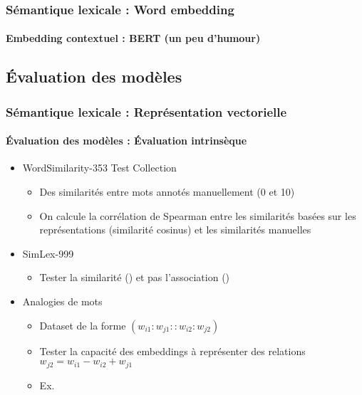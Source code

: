 \documentclass[xcolor=table]{beamer}
\begin{document}
\begin{frame}
\frametitle{Sémantique lexicale : Word embedding}
\framesubtitle{Embedding contextuel : BERT (un peu d'humour)}
	\vspace{-3pt}
	\begin{center}
	\end{center}
	
\end{frame}


\subsection{Évaluation des modèles}

\begin{frame}
\frametitle{Sémantique lexicale : Représentation vectorielle}
\framesubtitle{Évaluation des modèles : Évaluation intrinsèque}

\begin{itemize}
	\item  WordSimilarity-353 Test Collection \cite{2002-finkelstein-al}
	\begin{itemize}
		\item Des similarités entre mots annotés manuellement (0 et 10)
		\item On calcule la corrélation de Spearman entre les similarités basées sur les représentations (similarité cosinus) et les similarités manuelles
	\end{itemize}
	
	\item SimLex-999 \cite{2015-hill-al}
	\begin{itemize}
		\item Tester la similarité () et pas l'association ()
	\end{itemize}

	\item Analogies de mots \cite{2013-mikolov-al2}
	\begin{itemize}
		\item Dataset de la forme $(w_{i1}:w_{j1} :: w_{i2}:w_{j2})$
		\item Tester la capacité des embeddings à représenter des relations $w_{j2} = w_{i1} - w_{i2} + w_{j1}$
		\item Ex. 
	\end{itemize}

\end{itemize}
	
\end{frame}
\end{document}
